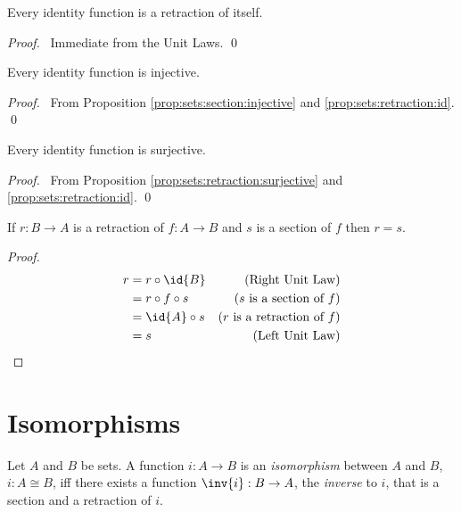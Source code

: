 \begin{prop}
\label{prop:sets:retraction:id}
Every identity function is a retraction of itself.
\end{prop}

\begin{proof}
\pf\ Immediate from the Unit Laws. \qed
\end{proof}

\begin{prop}
  \label{prop:sets:identity:injective}
 Every identity function is injective.
\end{prop}

\begin{proof}
  \pf\ From Proposition \ref{prop:sets:section:injective} and
  \ref{prop:sets:retraction:id}. \qed
\end{proof}

\begin{prop}
Every identity function is surjective.
\end{prop}

\begin{proof}
  \pf\ From Proposition \ref{prop:sets:retraction:surjective} and
  \ref{prop:sets:retraction:id}. \qed
\end{proof}

\begin{prop}
\label{prop:sets:retraction:ret_sect_unique}
If $r : B \rightarrow A$ is a retraction of $f : A \rightarrow B$ and $s$ is a section of $f$  then $ r = s$.
\end{prop}

\begin{proof}
\pf
\begin{align*}
r & = r \circ \id{B} & (\text{Right Unit Law}) \\
& = r \circ f \circ s & (\text{$s$ is a section of $f$}) \\
& = \id{A} \circ s & (\text{$r$ is a retraction of $f$}) \\
& = s & (\text{Left Unit Law})
\end{align*}
\end{proof}

\section{Isomorphisms}

\begin{df}[Isomorphism]
Let $A$ and $B$ be sets. A function $i : A \rightarrow B$  is an
\emph{isomorphism} between $A$ and $B$, $i : A \cong B$, iff there exists a
function $\inv{i} : B \rightarrow A$, the \emph{inverse} to $i$, that is a
section and a retraction of $i$.
\end{df}

